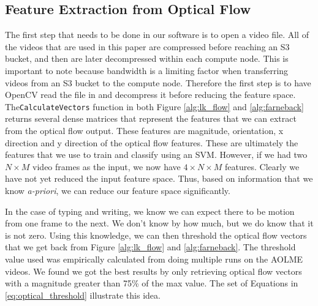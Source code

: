 \subsection{\label{subsection:feature_extraction}Feature Extraction from Optical Flow}
The first step that needs to be done in our software is to open a video file.
All of the videos that are used in this paper are compressed before reaching an
S3 bucket, and then are later decompressed  within each compute node. This is
important to note because bandwidth is a limiting factor when transferring
videos from an S3 bucket to the compute node.  Therefore the first step is to
have OpenCV read the file in and decompress it before  reducing the feature
space.
The\texttt{CalculateVectors} function in both Figure \ref{alg:lk_flow} and
\ref{alg:farneback} returns several dense matrices that represent the features
that we can extract from the optical flow output. These features are magnitude,
orientation, x direction and y direction of the optical flow features. These are
ultimately the features that we use to train and classify using an SVM. However,
if we had two $N \times M$ video frames as the input, we now have $4 \times N
\times M$ features. Clearly we have not yet reduced the input feature space.
Thus, based on information that we know \textit{a-priori}, we can reduce our
feature space significantly.



In the case of typing and writing, we know we can expect there to be motion from
one frame to the next. We don't know by how much, but we do know that it is not
zero. Using this knowledge, we can then threshold the optical flow vectors that
we get back from Figure \ref{alg:lk_flow} and \ref{alg:farneback}. The
threshold value used was empirically calculated from doing multiple runs on the
AOLME videos. We found we got the best results by only retrieving
optical flow vectors with a magnitude greater than 75\% of the max value. The set
of Equations in \ref{eq:optical_threshold} illustrate this idea.


